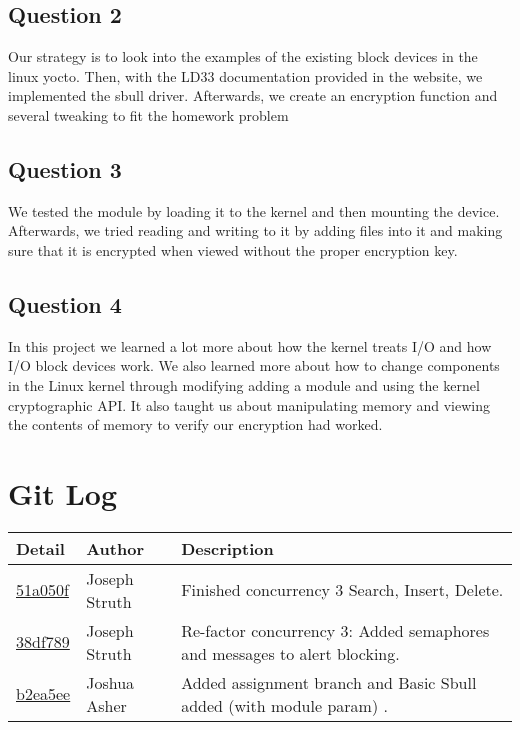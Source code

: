 \documentclass[10pt,draftclsnofoot,onecolumn, compsoc]{IEEEtran}
\begin{document}
\subsection{Question 2}
Our strategy is to look into the examples of the existing block devices in the linux yocto. Then, with the LD33 documentation provided in the website, we implemented the sbull driver. Afterwards, we create an encryption function and several tweaking to fit the homework problem


\subsection{Question 3}
We tested the module by loading it to the kernel and then mounting the device. Afterwards, we tried reading and writing to it by adding files into it and making sure that it is encrypted when viewed without the proper encryption key.

\subsection{Question 4}
In this project we learned a lot more about how the kernel treats I/O and how I/O block devices work. We also learned more about how to change components in the Linux kernel through modifying adding a module and using the kernel cryptographic API. It also taught us about manipulating memory and viewing the contents of memory to verify our encryption had worked.

\section{Git Log}

\begin{tabular}{| l | l | p{15cm} |}\textbf{Detail} & \textbf{Author} & \textbf{Description}\\\hline
\href{https://github.com/struthj/CS444/commit/51a050fe7c7f2831eebbac1a184406fcee8775f6}{51a050f} & Joseph Struth & Finished concurrency 3 Search, Insert, Delete.\\\hline
\href{https://github.com/struthj/CS444/commit/38df78912a1aea97e17e62ea8517e8b5a40e630a} {38df789} & Joseph Struth & Re-factor concurrency 3: Added semaphores and messages to alert blocking.\\\hline
\href{https://github.com/struthj/CS444-1303/commit/b2ea5ee982d97f6e618511c1c157c7f63ed53397}{b2ea5ee} & Joshua Asher & Added assignment branch and Basic Sbull added (with module param) .\\\hline
\end{tabular}
\end{document}
